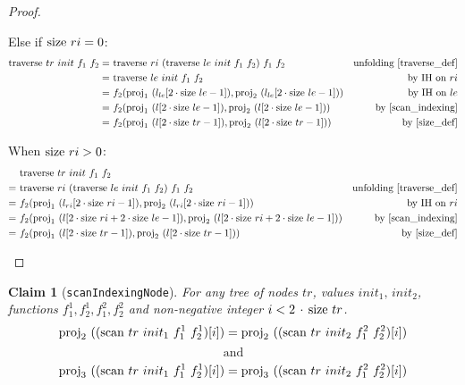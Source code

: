 \documentclass{article}
\newtheorem{claim}[lemma]{Claim}
\newcommand{\textfun}[1]{\textup{#1}}
\newcommand{\textcode}[1]{\texttt{#1}}
\newcommand{\longtraverse}[4]{\textfun{traverse}\ #1\ #2\ #3 \ #4}
\newcommand{\longscan}[4]{\textfun{scan}\ #1\ #2\ #3 \ #4}
\newcommand{\size}[1]{\textfun{size}\ #1}
\newcommand{\fst}[1]{\textfun{proj}_1\ #1}
\newcommand{\snd}[1]{\textfun{proj}_2\ #1}
\newcommand{\trd}[1]{\textfun{proj}_3\ #1}
\begin{document}
\begin{proof}
\begin{itemize}
\begin{itemize}
            
            Else if $\size{ri} = 0$:
            \begin{align*}
                \longtraverse{tr}{init}{f_1}{f_2}
                =\ & \longtraverse{ri}{(\longtraverse{le}{init}{f_1}{f_2})}{f_1}{f_2} &\text{unfolding \cref{traverse_def}} \\
                =\ & \longtraverse{le}{init}{f_1}{f_2} & \text{by IH on $ri$} \\
                =\ &  f_2(\fst{(l_{le}[2 \cdot \size{le} - 1])}, \snd{(l_{le}[2 \cdot \size{le} - 1])}) & \text{by IH on $le$} \\
                =\ &  f_2(\fst{(l[2 \cdot \size{le} - 1])}, \snd{(l[2 \cdot \size{le} - 1])}) & \text{by \cref{scan_indexing}} \\
                =\ &  f_2(\fst{(l[2 \cdot \size{tr} - 1])}, \snd{(l[2 \cdot \size{tr} - 1])}) & \text{by \cref{size_def}}
            \end{align*}

            When $\size{ri} > 0$:
            \begin{align*}
                &\longtraverse{tr}{init}{f_1}{f_2} \\
                =\ & \longtraverse{ri}{(\longtraverse{le}{init}{f_1}{f_2})}{f_1}{f_2} &\text{unfolding \cref{traverse_def}} \\
                =\ &  f_2(\fst{(l_{ri}[2 \cdot \size{ri} - 1])}, \snd{(l_{ri}[2 \cdot \size{ri} - 1])}) & \text{by IH on $ri$} \\
                =\ &  f_2(\fst{(l[2 \cdot \size{ri} + 2 \cdot \size{le} - 1])}, \snd{(l[2 \cdot \size{ri} + 2 \cdot \size{le} - 1])}) & \text{by \cref{scan_indexing}} \\
                =\ &  f_2(\fst{(l[2 \cdot \size{tr} - 1])}, \snd{(l[2 \cdot \size{tr} - 1])}) & \text{by \cref{size_def}}
            \end{align*}
    \end{itemize}
\end{itemize}

\end{proof}

\begin{claim}[\textcode{scanIndexingNode}]
    \label{scan_indexing_node}
    For any tree of nodes $tr$, values $init_1,\, init_2$, functions $f^1_1, f^1_2, f^2_1, f^2_2$ and non-negative integer $i < 2\, \cdot\, \size{tr}$.
    \[ \snd{((\longscan{tr}{init_1}{f^1_1}{f^1_2})[i])} = \snd{((\longscan{tr}{init_2}{f^2_1}{f^2_2})[i])}\]
    \[\text{and}\]
    \[ \trd{((\longscan{tr}{init_1}{f^1_1}{f^1_2})[i])} = \trd{((\longscan{tr}{init_2}{f^2_1}{f^2_2})[i])}\]
\end{claim}
\end{document}
